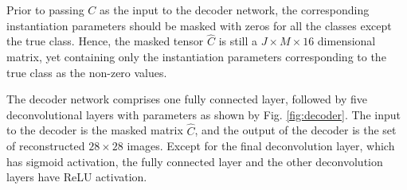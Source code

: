
Prior to passing $C$ as the input to the decoder network, the corresponding instantiation parameters should be masked with zeros for all the classes except the true class. Hence, the masked tensor $\widehat{C}$ is still a $J \times M \times16$ dimensional matrix, yet containing only the instantiation parameters corresponding to the true class as the non-zero values.

The decoder network comprises one fully connected layer, followed by five deconvolutional layers \cite{decon2010} with parameters as shown by Fig. \ref{fig:decoder}. The input to the decoder is the masked matrix $\widehat{C}$, and the output of the decoder is the set of reconstructed $28\times28$ images. Except for the final deconvolution layer, which has sigmoid activation, the fully connected layer and the other deconvolution layers have ReLU activation.

 

